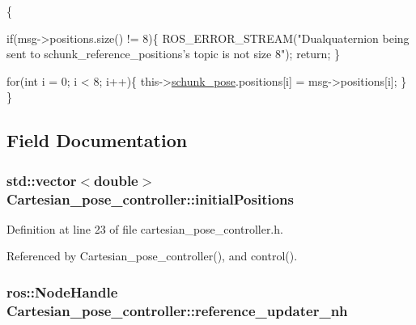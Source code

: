 \begin{DoxyCode}
                                                                               
                      \{

        \textcolor{keywordflow}{if}(msg->positions.size() != 8)\{
                ROS\_ERROR\_STREAM(\textcolor{stringliteral}{"Dualquaternion being sent to
       schunk\_reference\_positions's topic is not size 8"});
                \textcolor{keywordflow}{return};
        \}

        \textcolor{keywordflow}{for}(\textcolor{keywordtype}{int} i = 0; i < 8; i++)\{
                this->\hyperlink{classCartesian__pose__controller_a301bc44e901e4837cf036661478354c4}{schunk\_pose}.positions[i] = msg->positions[i];
        \}
\}
\end{DoxyCode}


\subsection{Field Documentation}
\hypertarget{classCartesian__pose__controller_a42433d7f2e4e03ccaac56e1f9a7a5027}{
\subsubsection[{initial\-Positions}]{\setlength{\rightskip}{0pt plus 5cm}std\-::vector$<$double$>$ Cartesian\-\_\-pose\-\_\-controller\-::initial\-Positions\hspace{0.3cm}{\ttfamily [private]}}}\label{classCartesian__pose__controller_a42433d7f2e4e03ccaac56e1f9a7a5027}


Definition at line 23 of file cartesian\-\_\-pose\-\_\-controller.\-h.



Referenced by Cartesian\-\_\-pose\-\_\-controller(), and control().

\hypertarget{classCartesian__pose__controller_ab2d5fe68c8229b6c90f84ac1601eb637}{
\subsubsection[{reference\-\_\-updater\-\_\-nh}]{\setlength{\rightskip}{0pt plus 5cm}ros\-::\-Node\-Handle Cartesian\-\_\-pose\-\_\-controller\-::reference\-\_\-updater\-\_\-nh\hspace{0.3cm}{\ttfamily [private]}}}\label{classCartesian__pose__controller_ab2d5fe68c8229b6c90f84ac1601eb637}


